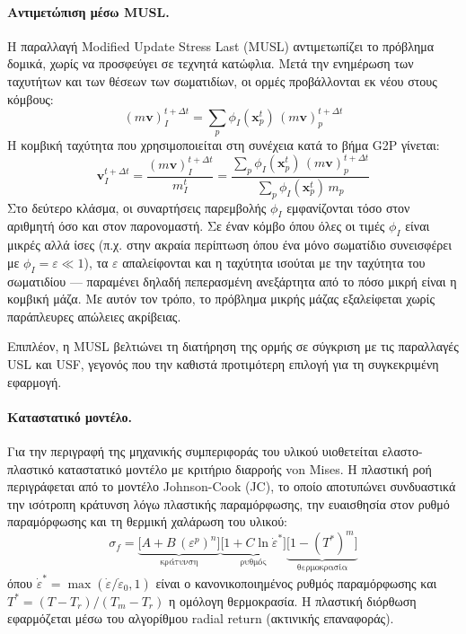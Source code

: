 \documentclass[12pt,a4paper]{report}
\begin{document}
	\paragraph{Αντιμετώπιση μέσω MUSL.}
	Η παραλλαγή Modified Update Stress Last (MUSL) αντιμετωπίζει το πρόβλημα δομικά, χωρίς να προσφεύγει σε τεχνητά κατώφλια. Μετά την ενημέρωση των ταχυτήτων και των θέσεων των σωματιδίων, οι ορμές προβάλλονται εκ νέου στους κόμβους:
	\[
		(m\mathbf{v})_I^{t+\Delta t} = \sum_p \phi_I(\mathbf{x}_p^t)\,(m\mathbf{v})_p^{t+\Delta t}
	\]
	Η κομβική ταχύτητα που χρησιμοποιείται στη συνέχεια κατά το βήμα G2P γίνεται:
	\[
		\mathbf{v}_I^{t+\Delta t} = \frac{(m\mathbf{v})_I^{t+\Delta t}}{m_I^t}
		= \frac{\sum_p \phi_I(\mathbf{x}_p^t)\,(m\mathbf{v})_p^{t+\Delta t}}{\sum_p \phi_I(\mathbf{x}_p^t)\,m_p}
	\]
	Στο δεύτερο κλάσμα, οι συναρτήσεις παρεμβολής $\phi_I$ εμφανίζονται τόσο στον αριθμητή όσο και στον παρονομαστή. Σε έναν κόμβο όπου όλες οι τιμές $\phi_I$ είναι μικρές αλλά ίσες (π.χ. στην ακραία περίπτωση όπου ένα μόνο σωματίδιο συνεισφέρει με $\phi_I = \varepsilon \ll 1$), τα $\varepsilon$ απαλείφονται και η ταχύτητα ισούται με την ταχύτητα του σωματιδίου — παραμένει δηλαδή πεπερασμένη ανεξάρτητα από το πόσο μικρή είναι η κομβική μάζα. Με αυτόν τον τρόπο, το πρόβλημα μικρής μάζας εξαλείφεται χωρίς παράπλευρες απώλειες ακρίβειας.

	Επιπλέον, η MUSL βελτιώνει τη διατήρηση της ορμής σε σύγκριση με τις παραλλαγές USL και USF, γεγονός που την καθιστά προτιμότερη επιλογή για τη συγκεκριμένη εφαρμογή.

	\paragraph{Καταστατικό μοντέλο.}
	Για την περιγραφή της μηχανικής συμπεριφοράς του υλικού υιοθετείται ελαστο-πλαστικό καταστατικό μοντέλο με κριτήριο διαρροής von Mises. Η πλαστική ροή περιγράφεται από το μοντέλο Johnson-Cook (JC), το οποίο αποτυπώνει συνδυαστικά την ισότροπη κράτυνση λόγω πλαστικής παραμόρφωσης, την ευαισθησία στον ρυθμό παραμόρφωσης και τη θερμική χαλάρωση του υλικού:
	\[
		\sigma_f = \underbrace{\bigl[A + B\,(\varepsilon^p)^n\bigr]}_{\text{κράτυνση}}
		\underbrace{\bigl[1 + C\ln\dot{\varepsilon}^*\bigr]}_{\text{ρυθμός}}
		\underbrace{\bigl[1 - (T^*)^m\bigr]}_{\text{θερμοκρασία}}
	\]
	όπου $\dot{\varepsilon}^* = \max(\dot{\varepsilon}/\dot{\varepsilon}_0, 1)$ είναι ο κανονικοποιημένος ρυθμός παραμόρφωσης και $T^* = (T-T_r)/(T_m-T_r)$ η ομόλογη θερμοκρασία. Η πλαστική διόρθωση εφαρμόζεται μέσω του αλγορίθμου radial return (ακτινικής επαναφοράς).
\end{document}
